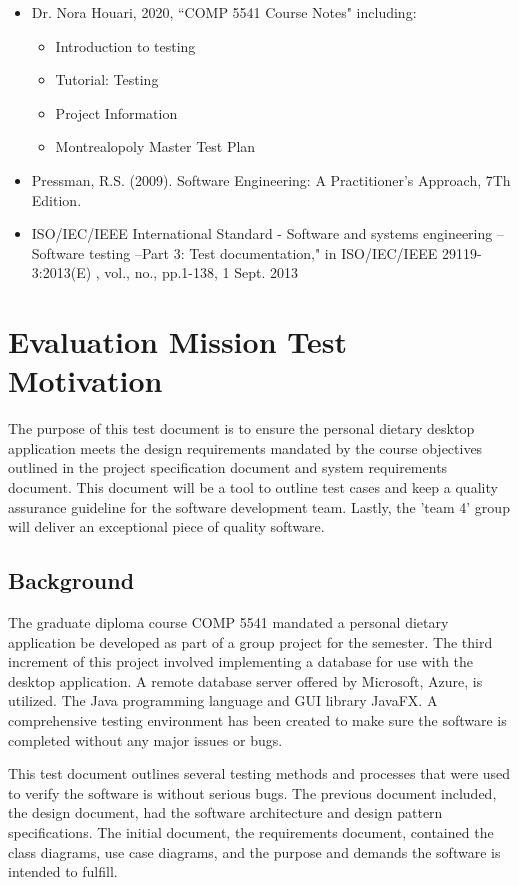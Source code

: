 \documentclass{scrreprt}
\begin{document}
    \begin{itemize}

        \item Dr. Nora Houari, 2020, ``COMP 5541 Course Notes" including:
        \begin{itemize}
            \item Introduction to testing
            \item Tutorial: Testing
            \item Project Information
            \item Montrealopoly Master Test Plan
        \end{itemize}
        \item Pressman, R.S. (2009). Software Engineering: A Practitioner's Approach, 7Th Edition.

        \item ISO/IEC/IEEE International Standard - Software and systems engineering -- Software testing --Part 3: Test documentation," in ISO/IEC/IEEE 29119-3:2013(E) , vol., no., pp.1-138, 1 Sept. 2013

    \end{itemize}

    \chapter{Evaluation Mission Test Motivation}
    
    The purpose of this test document is to ensure the personal dietary desktop application meets the design requirements mandated by the course objectives outlined in the project specification document and system requirements document. This document will be a tool to outline test cases and keep a quality assurance guideline for the software development team. Lastly, the 'team 4' group will deliver an exceptional piece of quality software.

    \section{Background}
The graduate diploma course COMP 5541 mandated a personal dietary application be developed as part of a group project for the semester. The third increment of this project involved implementing a database for use with the desktop application. A remote database server offered by Microsoft, Azure, is utilized. The Java programming language and GUI library JavaFX. A comprehensive testing environment has been created to make sure the software is completed without any major issues or bugs. 
\par
This test document outlines several testing methods and processes that were used to verify the software is without serious bugs. The previous document included, the design document, had the software architecture and design pattern specifications. The initial document, the requirements document, contained the class diagrams, use case diagrams, and the purpose and demands the software is intended to fulfill.
\end{document}
